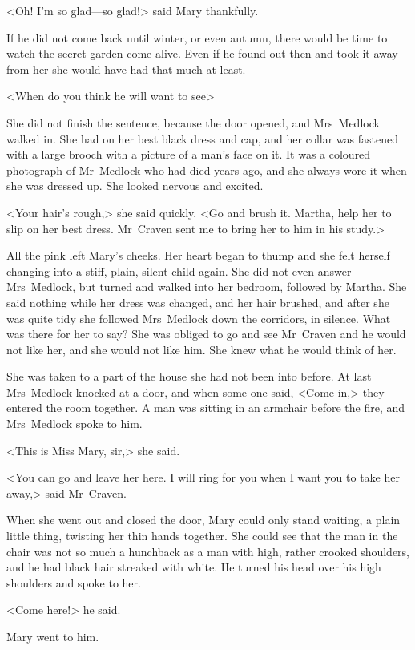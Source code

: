 <Oh! I'm so glad—so glad!> said Mary thankfully.

If he did not come back until winter, or even autumn, there would be time to watch the secret garden come alive. Even if he found out then and took it away from her she would have had that much at least.

<When do you think he will want to see\longdash>

She did not finish the sentence, because the door opened, and Mrs~Medlock walked in. She had on her best black dress and cap, and her collar was fastened with a large brooch with a picture of a man's face on it. It was a coloured photograph of Mr~Medlock who had died years ago, and she always wore it when she was dressed up. She looked nervous and excited.

<Your hair's rough,> she said quickly. <Go and brush it. Martha, help her to slip on her best dress. Mr~Craven sent me to bring her to him in his study.>

All the pink left Mary's cheeks. Her heart began to thump and she felt herself changing into a stiff, plain, silent child again. She did not even answer Mrs~Medlock, but turned and walked into her bedroom, followed by Martha. She said nothing while her dress was changed, and her hair brushed, and after she was quite tidy she followed Mrs~Medlock down the corridors, in silence. What was there for her to say? She was obliged to go and see Mr~Craven and he would not like her, and she would not like him. She knew what he would think of her.

She was taken to a part of the house she had not been into before. At last Mrs~Medlock knocked at a door, and when some one said, <Come in,> they entered the room together. A man was sitting in an armchair before the fire, and Mrs~Medlock spoke to him.

<This is Miss Mary, sir,> she said.

<You can go and leave her here. I will ring for you when I want you to take her away,> said Mr~Craven.

When she went out and closed the door, Mary could only stand waiting, a plain little thing, twisting her thin hands together. She could see that the man in the chair was not so much a hunchback as a man with high, rather crooked shoulders, and he had black hair streaked with white. He turned his head over his high shoulders and spoke to her.

<Come here!> he said.

Mary went to him.

